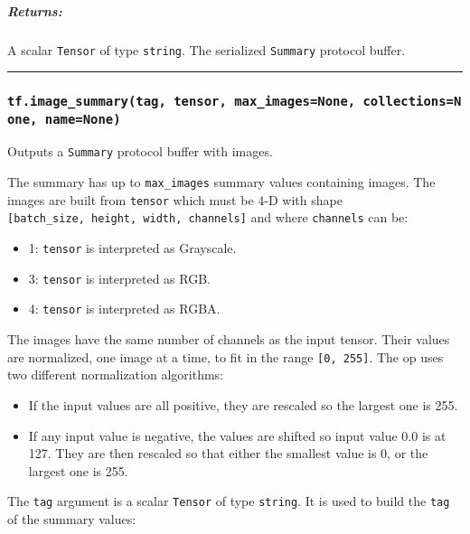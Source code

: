 \subparagraph{Returns: }\label{returns-21}

A scalar \texttt{Tensor} of type \texttt{string}. The serialized
\texttt{Summary} protocol buffer.

\begin{center}\rule{0.5\linewidth}{\linethickness}\end{center}

\subsubsection{\texorpdfstring{\texttt{tf.image\_summary(tag,\ tensor,\ max\_images=None,\ collections=None,\ name=None)}
}{tf.image\_summary(tag, tensor, max\_images=None, collections=None, name=None) }}\label{tf.imageux5fsummarytag-tensor-maxux5fimagesnone-collectionsnone-namenone}

Outputs a \texttt{Summary} protocol buffer with images.

The summary has up to \texttt{max\_images} summary values containing
images. The images are built from \texttt{tensor} which must be 4-D with
shape \texttt{{[}batch\_size,\ height,\ width,\ channels{]}} and where
\texttt{channels} can be:

\begin{itemize}
\tightlist
\item
  1: \texttt{tensor} is interpreted as Grayscale.
\item
  3: \texttt{tensor} is interpreted as RGB.
\item
  4: \texttt{tensor} is interpreted as RGBA.
\end{itemize}

The images have the same number of channels as the input tensor. Their
values are normalized, one image at a time, to fit in the range
\texttt{{[}0,\ 255{]}}. The op uses two different normalization
algorithms:

\begin{itemize}
\item
  If the input values are all positive, they are rescaled so the largest
  one is 255.
\item
  If any input value is negative, the values are shifted so input value
  0.0 is at 127. They are then rescaled so that either the smallest
  value is 0, or the largest one is 255.
\end{itemize}

The \texttt{tag} argument is a scalar \texttt{Tensor} of type
\texttt{string}. It is used to build the \texttt{tag} of the summary
values:

